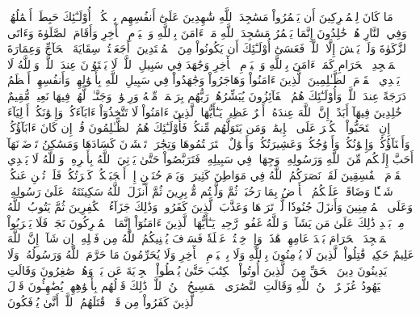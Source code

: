 مَا كَانَ لِلۡمُشۡرِكِينَ أَن يَعۡمُرُواْ مَسَٰجِدَ ٱللَّهِ شَٰهِدِينَ عَلَىٰٓ أَنفُسِهِم بِٱلۡكُفۡرِۚ أُوْلَـٰٓئِكَ حَبِطَتۡ أَعۡمَٰلُهُمۡ وَفِي ٱلنَّارِ هُمۡ خَٰلِدُونَ
إِنَّمَا يَعۡمُرُ مَسَٰجِدَ ٱللَّهِ مَنۡ ءَامَنَ بِٱللَّهِ وَٱلۡيَوۡمِ ٱلۡأٓخِرِ وَأَقَامَ ٱلصَّلَوٰةَ وَءَاتَى ٱلزَّكَوٰةَ وَلَمۡ يَخۡشَ إِلَّا ٱللَّهَۖ فَعَسَىٰٓ أُوْلَـٰٓئِكَ أَن يَكُونُواْ مِنَ ٱلۡمُهۡتَدِينَ
۞أَجَعَلۡتُمۡ سِقَايَةَ ٱلۡحَآجِّ وَعِمَارَةَ ٱلۡمَسۡجِدِ ٱلۡحَرَامِ كَمَنۡ ءَامَنَ بِٱللَّهِ وَٱلۡيَوۡمِ ٱلۡأٓخِرِ وَجَٰهَدَ فِي سَبِيلِ ٱللَّهِۚ لَا يَسۡتَوُۥنَ عِندَ ٱللَّهِۗ وَٱللَّهُ لَا يَهۡدِي ٱلۡقَوۡمَ ٱلظَّـٰلِمِينَ
ٱلَّذِينَ ءَامَنُواْ وَهَاجَرُواْ وَجَٰهَدُواْ فِي سَبِيلِ ٱللَّهِ بِأَمۡوَٰلِهِمۡ وَأَنفُسِهِمۡ أَعۡظَمُ دَرَجَةً عِندَ ٱللَّهِۚ وَأُوْلَـٰٓئِكَ هُمُ ٱلۡفَآئِزُونَ
يُبَشِّرُهُمۡ رَبُّهُم بِرَحۡمَةٖ مِّنۡهُ وَرِضۡوَٰنٖ وَجَنَّـٰتٖ لَّهُمۡ فِيهَا نَعِيمٞ مُّقِيمٌ
خَٰلِدِينَ فِيهَآ أَبَدًاۚ إِنَّ ٱللَّهَ عِندَهُۥٓ أَجۡرٌ عَظِيمٞ
يَـٰٓأَيُّهَا ٱلَّذِينَ ءَامَنُواْ لَا تَتَّخِذُوٓاْ ءَابَآءَكُمۡ وَإِخۡوَٰنَكُمۡ أَوۡلِيَآءَ إِنِ ٱسۡتَحَبُّواْ ٱلۡكُفۡرَ عَلَى ٱلۡإِيمَٰنِۚ وَمَن يَتَوَلَّهُم مِّنكُمۡ فَأُوْلَـٰٓئِكَ هُمُ ٱلظَّـٰلِمُونَ
قُلۡ إِن كَانَ ءَابَآؤُكُمۡ وَأَبۡنَآؤُكُمۡ وَإِخۡوَٰنُكُمۡ وَأَزۡوَٰجُكُمۡ وَعَشِيرَتُكُمۡ وَأَمۡوَٰلٌ ٱقۡتَرَفۡتُمُوهَا وَتِجَٰرَةٞ تَخۡشَوۡنَ كَسَادَهَا وَمَسَٰكِنُ تَرۡضَوۡنَهَآ أَحَبَّ إِلَيۡكُم مِّنَ ٱللَّهِ وَرَسُولِهِۦ وَجِهَادٖ فِي سَبِيلِهِۦ فَتَرَبَّصُواْ حَتَّىٰ يَأۡتِيَ ٱللَّهُ بِأَمۡرِهِۦۗ وَٱللَّهُ لَا يَهۡدِي ٱلۡقَوۡمَ ٱلۡفَٰسِقِينَ
لَقَدۡ نَصَرَكُمُ ٱللَّهُ فِي مَوَاطِنَ كَثِيرَةٖ وَيَوۡمَ حُنَيۡنٍ إِذۡ أَعۡجَبَتۡكُمۡ كَثۡرَتُكُمۡ فَلَمۡ تُغۡنِ عَنكُمۡ شَيۡـٔٗا وَضَاقَتۡ عَلَيۡكُمُ ٱلۡأَرۡضُ بِمَا رَحُبَتۡ ثُمَّ وَلَّيۡتُم مُّدۡبِرِينَ
ثُمَّ أَنزَلَ ٱللَّهُ سَكِينَتَهُۥ عَلَىٰ رَسُولِهِۦ وَعَلَى ٱلۡمُؤۡمِنِينَ وَأَنزَلَ جُنُودٗا لَّمۡ تَرَوۡهَا وَعَذَّبَ ٱلَّذِينَ كَفَرُواْۚ وَذَٰلِكَ جَزَآءُ ٱلۡكَٰفِرِينَ
ثُمَّ يَتُوبُ ٱللَّهُ مِنۢ بَعۡدِ ذَٰلِكَ عَلَىٰ مَن يَشَآءُۗ وَٱللَّهُ غَفُورٞ رَّحِيمٞ
يَـٰٓأَيُّهَا ٱلَّذِينَ ءَامَنُوٓاْ إِنَّمَا ٱلۡمُشۡرِكُونَ نَجَسٞ فَلَا يَقۡرَبُواْ ٱلۡمَسۡجِدَ ٱلۡحَرَامَ بَعۡدَ عَامِهِمۡ هَٰذَاۚ وَإِنۡ خِفۡتُمۡ عَيۡلَةٗ فَسَوۡفَ يُغۡنِيكُمُ ٱللَّهُ مِن فَضۡلِهِۦٓ إِن شَآءَۚ إِنَّ ٱللَّهَ عَلِيمٌ حَكِيمٞ
قَٰتِلُواْ ٱلَّذِينَ لَا يُؤۡمِنُونَ بِٱللَّهِ وَلَا بِٱلۡيَوۡمِ ٱلۡأٓخِرِ وَلَا يُحَرِّمُونَ مَا حَرَّمَ ٱللَّهُ وَرَسُولُهُۥ وَلَا يَدِينُونَ دِينَ ٱلۡحَقِّ مِنَ ٱلَّذِينَ أُوتُواْ ٱلۡكِتَٰبَ حَتَّىٰ يُعۡطُواْ ٱلۡجِزۡيَةَ عَن يَدٖ وَهُمۡ صَٰغِرُونَ
وَقَالَتِ ٱلۡيَهُودُ عُزَيۡرٌ ٱبۡنُ ٱللَّهِ وَقَالَتِ ٱلنَّصَٰرَى ٱلۡمَسِيحُ ٱبۡنُ ٱللَّهِۖ ذَٰلِكَ قَوۡلُهُم بِأَفۡوَٰهِهِمۡۖ يُضَٰهِـُٔونَ قَوۡلَ ٱلَّذِينَ كَفَرُواْ مِن قَبۡلُۚ قَٰتَلَهُمُ ٱللَّهُۖ أَنَّىٰ يُؤۡفَكُونَ
